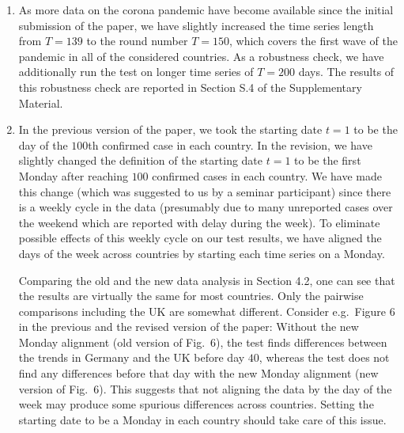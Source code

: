 \documentclass[a4paper,12pt]{article}
\begin{document}
\begin{enumerate}[label=(\roman*), leftmargin=0.8cm]

\item As more data on the corona pandemic have become available since the initial submission of the paper, we have slightly increased the time series length from $T=139$ to the round number $T=150$, which covers the first wave of the pandemic in all of the considered countries. As a robustness check, we have additionally run the test on longer time series of $T=200$ days. The results of this robustness check are reported in Section S.4 of the Supplementary Material. 

\item In the previous version of the paper, we took the starting date $t=1$ to be the day of the $100$th confirmed case in each country. In the revision, we have slightly changed the definition of the starting date $t=1$ to be the first Monday after reaching $100$ confirmed cases in each country. We have made this change (which was suggested to us by a seminar participant) since there is a weekly cycle in the data (presumably due to many unreported cases over the weekend which are reported with delay during the week). To eliminate possible effects of this weekly cycle on our test results, we have aligned the days of the week across countries by starting each time series on a Monday. 

Comparing the old and the new data analysis in Section 4.2, one can see that the results are virtually the same for most countries. Only the pairwise comparisons including the UK are somewhat different. Consider e.g.\ Figure 6 in the previous and the revised version of the paper: Without the new Monday alignment (old version of Fig.\ 6), the test finds differences between the trends in Germany and the UK before day $40$, whereas the test does not find any differences before that day with the new Monday alignment (new version of Fig.\ 6). 
This suggests that not aligning the data by the day of the week may produce some spurious differences across countries. Setting the starting date to be a Monday in each country should take care of this issue.


\end{enumerate}
\end{document}
